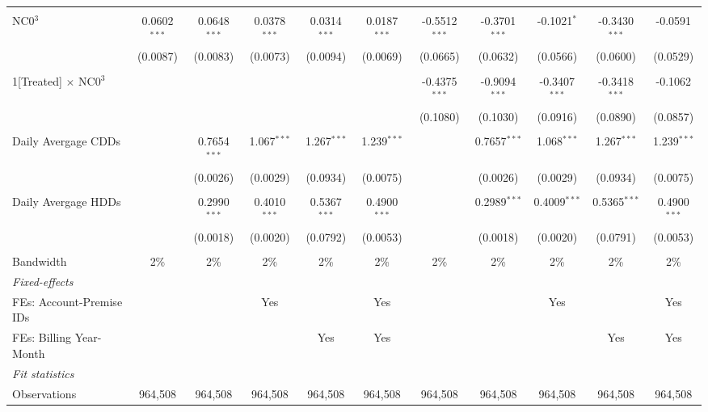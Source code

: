 \begin{table}[htbp]
\begin{adjustbox}{scale = 0.7}
\begin{tabular}{lcccccccccc}
&   &   &   &   &   &   &   &   &   &  \\
NC0$^3$&0.0602$^{***}$ & 0.0648$^{***}$ & 0.0378$^{***}$ & 0.0314$^{***}$ & 0.0187$^{***}$ & -0.5512$^{***}$ & -0.3701$^{***}$ & -0.1021$^{*}$ & -0.3430$^{***}$ & -0.0591\\
  &(0.0087) & (0.0083) & (0.0073) & (0.0094) & (0.0069) & (0.0665) & (0.0632) & (0.0566) & (0.0600) & (0.0529)\\
&   &   &   &   &   &   &   &   &   &  \\
1[Treated] $\times $ NC0$^3$&   &    &    &    &    & -0.4375$^{***}$ & -0.9094$^{***}$ & -0.3407$^{***}$ & -0.3418$^{***}$ & -0.1062\\
  &   &    &    &    &    & (0.1080) & (0.1030) & (0.0916) & (0.0890) & (0.0857)\\
&   &   &   &   &   &   &   &   &   &  \\
Daily Avergage CDDs&   & 0.7654$^{***}$ & 1.067$^{***}$ & 1.267$^{***}$ & 1.239$^{***}$ &    & 0.7657$^{***}$ & 1.068$^{***}$ & 1.267$^{***}$ & 1.239$^{***}$\\
  &   & (0.0026) & (0.0029) & (0.0934) & (0.0075) &    & (0.0026) & (0.0029) & (0.0934) & (0.0075)\\
&   &   &   &   &   &   &   &   &   &  \\
Daily Avergage HDDs&   & 0.2990$^{***}$ & 0.4010$^{***}$ & 0.5367$^{***}$ & 0.4900$^{***}$ &    & 0.2989$^{***}$ & 0.4009$^{***}$ & 0.5365$^{***}$ & 0.4900$^{***}$\\
  &   & (0.0018) & (0.0020) & (0.0792) & (0.0053) &    & (0.0018) & (0.0020) & (0.0791) & (0.0053)\\
&   &   &   &   &   &   &   &   &   &  \\
\midrule Bandwidth & 2\% & 2\% & 2\% & 2\% & 2\% & 2\% & 2\% & 2\% & 2\% & 2\%\\
\midrule
\emph{Fixed-effects}&   &   &   &   &   &   &   &   &   &  \\
FEs: Account-Premise IDs &  &  & Yes &  & Yes &  &  & Yes &  & Yes\\
FEs: Billing Year-Month &  &  &  & Yes & Yes &  &  &  & Yes & Yes\\
\midrule
\emph{Fit statistics}&  & & & & & & & & & \\
Observations & 964,508&964,508&964,508&964,508&964,508&964,508&964,508&964,508&964,508&964,508\\

\end{tabular}
\end{adjustbox}
\end{table}
